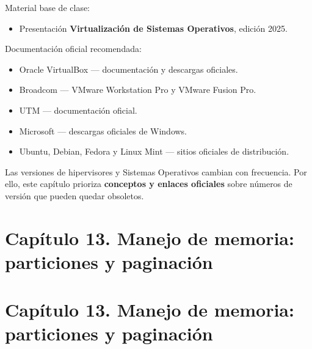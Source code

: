 \documentclass[
  spanish,
  letterpaper,
]{scrbook}
\providecommand{\tightlist}{%
  \setlength{\itemsep}{0pt}\setlength{\parskip}{0pt}}
\begin{document}
Material base de clase:

\begin{itemize}
\tightlist
\item
  Presentación \textbf{Virtualización de Sistemas Operativos}, edición
  2025.
\end{itemize}

Documentación oficial recomendada:

\begin{itemize}
\tightlist
\item
  Oracle VirtualBox --- documentación y descargas oficiales.
\item
  Broadcom --- VMware Workstation Pro y VMware Fusion Pro.
\item
  UTM --- documentación oficial.
\item
  Microsoft --- descargas oficiales de Windows.
\item
  Ubuntu, Debian, Fedora y Linux Mint --- sitios oficiales de
  distribución.
\end{itemize}

\begin{tcolorbox}[enhanced jigsaw, arc=.35mm, bottomrule=.15mm, bottomtitle=1mm, breakable, colback=white, colbacktitle=quarto-callout-tip-color!10!white, colframe=quarto-callout-tip-color-frame, coltitle=black, left=2mm, leftrule=.75mm, opacityback=0, opacitybacktitle=0.6, rightrule=.15mm, title=\textcolor{quarto-callout-tip-color}{\faLightbulb}\hspace{0.5em}{Criterio editorial}, titlerule=0mm, toprule=.15mm, toptitle=1mm]

Las versiones de hipervisores y Sistemas Operativos cambian con
frecuencia. Por ello, este capítulo prioriza \textbf{conceptos y enlaces
oficiales} sobre números de versión que pueden quedar obsoletos.

\end{tcolorbox}


\chapter{Capítulo 13. Manejo de memoria: particiones y
paginación}\label{capuxedtulo-13.-manejo-de-memoria-particiones-y-paginaciuxf3n}


\chapter{Capítulo 13. Manejo de memoria: particiones y
paginación}\label{capuxedtulo-13.-manejo-de-memoria-particiones-y-paginaciuxf3n-1}
\end{document}

